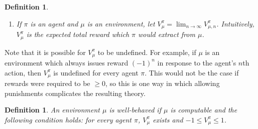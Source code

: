 \documentclass[runningheads]{llncs}
\newtheorem{mydefinition}[mytheorem]{Definition}
\begin{document}
\begin{mydefinition}
\begin{enumerate}
\begin{enumerate}
            on the probability measure $\mu(\bullet|\langle\rangle)$.
            \item $a_0\in\mathcal A$ is chosen randomly based on the probability
            measure $\pi(\bullet|o_0,r_0)$.
            \item
            For each $i>0$,
            $(o_i,r_i)\in\mathcal O\times\mathcal R$ is chosen randomly based on
            the probability measure
            $\mu(\bullet|o_0,r_0,a_0,\ldots,o_{i-1},r_{i-1},a_{i-1})$.
            \item
            For each $i>0$,
            $a_i\in\mathcal A$ is chosen randomly based on the probability measure
            $\pi(\bullet|o_0,r_0,a_0,\ldots,o_{i-1},r_{i-1},a_{i-1},o_i,r_i)$.
        \end{enumerate}
        \item
        If $\pi$ is an agent and $\mu$ is an environment,
        let $V^\pi_\mu=\lim_{n\to\infty}V^{\pi}_{\mu,n}$.
        Intuitively, $V^\pi_\mu$ is the expected total reward which $\pi$ would extract
        from $\mu$.
    \end{enumerate}
\end{mydefinition}

Note that it is possible for $V^\pi_\mu$ to be undefined.
For example, if $\mu$ is an environment which always issues
reward $(-1)^n$ in response to the agent's $n$th action,
then $V^\pi_\mu$ is undefined for every agent $\pi$.
This would not be the case if rewards were required to be $\geq 0$,
so this is one way in which allowing
punishments complicates the resulting theory.

\begin{mydefinition}
    An environment $\mu$ is \emph{well-behaved} if $\mu$ is computable and the following
    condition holds: for every agent $\pi$, $V^\pi_\mu$ exists and
    $-1\leq V^\pi_\mu\leq 1$.
\end{mydefinition}
\end{document}
